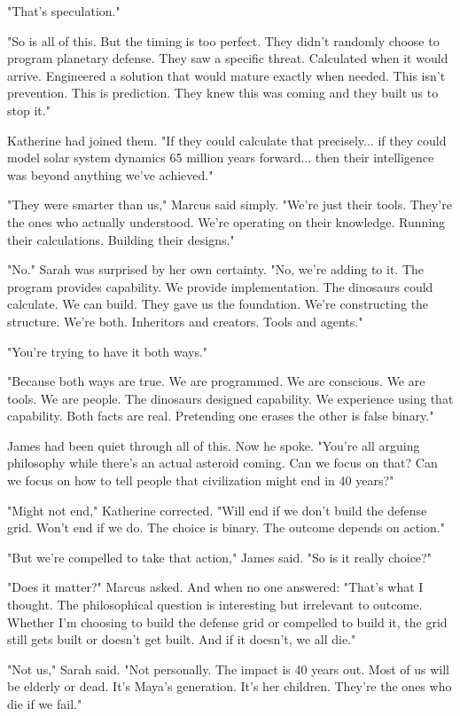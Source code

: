 "That's speculation."

"So is all of this. But the timing is too perfect. They didn't randomly choose to program planetary defense. They saw a specific threat. Calculated when it would arrive. Engineered a solution that would mature exactly when needed. This isn't prevention. This is prediction. They knew this was coming and they built us to stop it."

Katherine had joined them. "If they could calculate that precisely... if they could model solar system dynamics 65 million years forward... then their intelligence was beyond anything we've achieved."

"They were smarter than us," Marcus said simply. "We're just their tools. They're the ones who actually understood. We're operating on their knowledge. Running their calculations. Building their designs."

"No." Sarah was surprised by her own certainty. "No, we're adding to it. The program provides capability. We provide implementation. The dinosaurs could calculate. We can build. They gave us the foundation. We're constructing the structure. We're both. Inheritors and creators. Tools and agents."

"You're trying to have it both ways."

"Because both ways are true. We are programmed. We are conscious. We are tools. We are people. The dinosaurs designed capability. We experience using that capability. Both facts are real. Pretending one erases the other is false binary."

James had been quiet through all of this. Now he spoke. "You're all arguing philosophy while there's an actual asteroid coming. Can we focus on that? Can we focus on how to tell people that civilization might end in 40 years?"

"Might not end," Katherine corrected. "Will end if we don't build the defense grid. Won't end if we do. The choice is binary. The outcome depends on action."

"But we're compelled to take that action," James said. "So is it really choice?"

"Does it matter?" Marcus asked. And when no one answered: "That's what I thought. The philosophical question is interesting but irrelevant to outcome. Whether I'm choosing to build the defense grid or compelled to build it, the grid still gets built or doesn't get built. And if it doesn't, we all die."

"Not us," Sarah said. "Not personally. The impact is 40 years out. Most of us will be elderly or dead. It's Maya's generation. It's her children. They're the ones who die if we fail."

